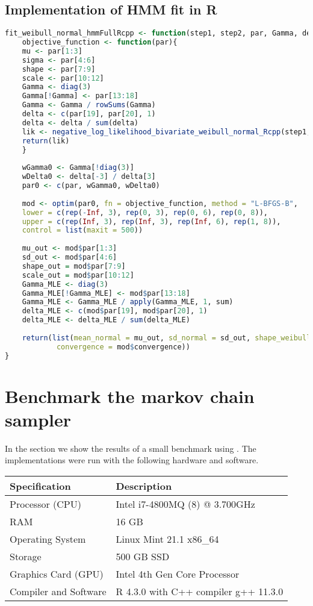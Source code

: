 \subsection{Implementation of HMM fit in R}
\begin{lstlisting}[language = R]
fit_weibull_normal_hmmFullRcpp <- function(step1, step2, par, Gamma, delta, covarianceMatrix = NULL, eps = 0.001) { 
    objective_function <- function(par){
    mu <- par[1:3]
    sigma <- par[4:6]
    shape <- par[7:9] 
    scale <- par[10:12]
    Gamma <- diag(3) 
    Gamma[!Gamma] <- par[13:18]
    Gamma <- Gamma / rowSums(Gamma)
    delta <- c(par[19], par[20], 1)
    delta <- delta / sum(delta)
    lik <- negative_log_likelihood_bivariate_weibull_normal_Rcpp(step1, step2, mu, sigma, shape, scale, Gamma, covarianceMatrix, delta, eps)
    return(lik)
    }
        
    wGamma0 <- Gamma[!diag(3)]
    wDelta0 <- delta[-3] / delta[3]
    par0 <- c(par, wGamma0, wDelta0)
    
    mod <- optim(par0, fn = objective_function, method = "L-BFGS-B",
    lower = c(rep(-Inf, 3), rep(0, 3), rep(0, 6), rep(0, 8)),
    upper = c(rep(Inf, 3), rep(Inf, 3), rep(Inf, 6), rep(1, 8)),
    control = list(maxit = 500))
    
    mu_out <- mod$par[1:3]
    sd_out <- mod$par[4:6] 
    shape_out = mod$par[7:9]
    scale_out = mod$par[10:12]
    Gamma_MLE <- diag(3)
    Gamma_MLE[!Gamma_MLE] <- mod$par[13:18] 
    Gamma_MLE <- Gamma_MLE / apply(Gamma_MLE, 1, sum)
    delta_MLE <- c(mod$par[19], mod$par[20], 1)
    delta_MLE <- delta_MLE / sum(delta_MLE)
        
    return(list(mean_normal = mu_out, sd_normal = sd_out, shape_weibull = shape_out,scale_weibull = scale_out, Gamma = Gamma_MLE, delta = delta_MLE, numIter = mod$counts, minimum = mod$value,
            convergence = mod$convergence))
}
\end{lstlisting}
\newpage
\section{Benchmark the markov chain sampler}\label{benchmarkSection}
In the section we show the results of a small benchmark using \cite{microbenchmark}. The implementations were run with the following hardware and software.
\begin{table}[ht]
    \centering
    \begin{tabular}{ll}
      \hline
      \textbf{Specification} & \textbf{Description} \\
      \hline
      Processor (CPU) & Intel i7-4800MQ (8) @ 3.700GHz \\
      RAM & 16 GB \\
      Operating System & Linux Mint 21.1 x86\_64 \\
      Storage & 500 GB SSD \\
      Graphics Card (GPU) & Intel 4th Gen Core Processor \\
      Compiler and Software & R 4.3.0 with C++ compiler g++ 11.3.0\\
      \hline
    \end{tabular}
  \end{table}
